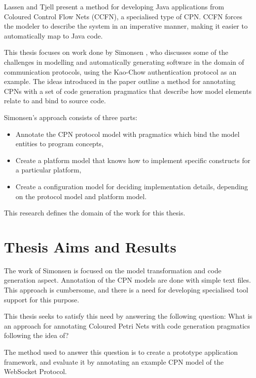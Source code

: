 Lassen and Tjell \cite{lassen2010automatic}  present a method for developing
Java applications from Coloured Control Flow Nets (CCFN), a specialised type of
CPN. CCFN forces the modeler to describe the system in an
imperative manner, making it easier to automatically map to Java code.

This thesis focuses on work done by Simonsen \cite{Simonsen2011}, who discusses
some of the challenges in modelling and automatically generating software in the
domain of communication protocols, using the Kao-Chow authentication protocol
as an example.
The ideas introduced in the paper outline a method for annotating CPNs with a
set of code generation pragmatics that describe how model elements relate to and
bind to source code. 

Simonsen's approach consists of three parts: 
\begin{itemize}
	\item Annotate the CPN protocol model with pragmatics which bind the model
	entities to program concepts,
	\item Create a platform	model that knows how to implement specific constructs
	for a particular platform,
	\item Create a configuration model for deciding implementation details,
	depending on the protocol model and platform model.   
\end{itemize}   

This research defines the domain of the work for this thesis.

\section{Thesis Aims and Results}
The work of Simonsen is focused on the model transformation and code generation
aspect. Annotation of the CPN models are done with simple text files. This
approach is cumbersome, and there is a need for developing specialised
tool support for this purpose.

This thesis seeks to satisfy this need by answering the following
question: What is an approach for annotating Coloured Petri Nets with code
generation pragmatics following the idea of?

The method used to answer this question is to create a prototype application
framework, and evaluate it by annotating an example CPN model of the
WebSocket Protocol.

